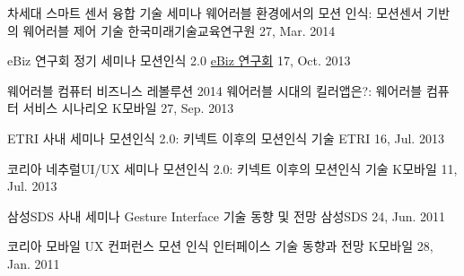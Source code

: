 


\begin{cventries}

  \cventry
    {차세대 스마트 센서 융합 기술 세미나} %
    {웨어러블 환경에서의 모션 인식: 모션센서 기반의 웨어러블 제어 기술} %
    {한국미래기술교육연구원} %
    {27, Mar. 2014} %
    {}

  \cventry
    {eBiz 연구회 정기 세미나} %
    {모션인식 2.0} %
    {\href{http://www.dure.net/SIG.html}{eBiz 연구회}} %
    {17, Oct. 2013} %
    {}

  \cventry
    {웨어러블 컴퓨터 비즈니스 레볼루션 2014} %
    {웨어러블 시대의 킬러앱은?: 웨어러블 컴퓨터 서비스 시나리오} %
    {K모바일} %
    {27, Sep. 2013} %
    {}

  \cventry
    {ETRI 사내 세미나} %
    {모션인식 2.0: 키넥트 이후의 모션인식 기술} %
    {ETRI} %
    {16, Jul. 2013} %
    {}

  \cventry
    {코리아 네추럴UI/UX 세미나} %
    {모션인식 2.0: 키넥트 이후의 모션인식 기술} %
    {K모바일} %
    {11, Jul. 2013} %
    {}

  \cventry
    {삼성SDS 사내 세미나} %
    {Gesture Interface 기술 동향 및 전망} %
    {삼성SDS} %
    {24, Jun. 2011} %
    {}
    
  \cventry
    {코리아 모바일 UX 컨퍼런스} %
    {모션 인식 인터페이스 기술 동향과 전망} %
    {K모바일} %
    {28, Jan. 2011} %
    {}
\end{cventries}
